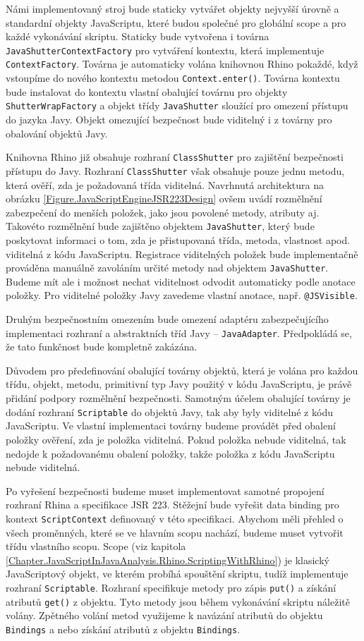 Námi implementovaný stroj bude staticky vytvářet objekty nejvyšší úrovně a standardní objekty JavaScriptu, které budou společné pro globální scope a pro každé vykonávání skriptu. Staticky bude vytvořena i továrna \texttt{JavaShutterContextFactory} pro vytváření kontextu, která implementuje \texttt{ContextFactory}. Továrna je automaticky volána knihovnou Rhino pokaždé, když vstoupíme do nového kontextu metodou \texttt{Context.enter()}. Továrna kontextu bude instalovat do kontextu vlastní obalující továrnu pro objekty \texttt{ShutterWrapFactory} a objekt třídy \texttt{JavaShutter} sloužící pro omezení přístupu do jazyka Javy. Objekt omezující bezpečnost bude viditelný i z továrny pro obalování objektů Javy.

Knihovna Rhino již obsahuje rozhraní \texttt{ClassShutter} pro zajištění bezpečnosti přístupu do Javy. Rozhraní \texttt{ClassShutter} však obsahuje pouze jednu metodu, která ověří, zda je požadovaná třída viditelná. Navrhnutá architektura na obrázku \ref{Figure.JavaScriptEngineJSR223Design} ovšem uvádí rozmělnění zabezpečení do menších položek, jako jsou povolené metody, atributy aj. Takovéto rozmělnění bude zajištěno objektem \texttt{JavaShutter}, který bude poskytovat informaci o tom, zda je přistupovaná třída, metoda, vlastnost apod. viditelná z kódu JavaScriptu. Registrace viditelných položek bude implementačně prováděna manuálně zavoláním určité metody nad objektem \texttt{JavaShutter}. Budeme mít ale i možnost nechat viditelnost odvodit automaticky podle anotace položky. Pro viditelné položky Javy zavedeme vlastní anotace, např. \texttt{@JSVisible}. 

Druhým bezpečnostním omezením bude omezení adaptéru zabezpečujícího implementaci rozhraní a abstraktních tříd Javy -- \texttt{JavaAdapter}. Předpokládá se, že tato funkčnost bude kompletně zakázána.

Důvodem pro předefinování obalující továrny objektů, která je volána pro každou třídu, objekt, metodu, primitivní typ Javy použitý v kódu JavaScriptu, je právě přidání podpory rozmělnění bezpečnosti. Samotným účelem obalující továrny je dodání rozhraní \texttt{Scriptable} do objektů Javy, tak aby byly viditelné z kódu JavaScriptu. Ve vlastní implementaci továrny budeme provádět před obalení položky ověření, zda je položka viditelná. Pokud položka nebude viditelná, tak nedojde k požadovanému obalení položky, takže položka z kódu JavaScriptu nebude viditelná.

Po vyřešení bezpečnosti budeme muset implementovat samotné propojení rozhraní Rhina a specifikace JSR 223. Stěžejní bude vyřešit data binding pro kontext \texttt{ScriptContext} definovaný v této specifikaci. Abychom měli přehled o všech proměnných, které se ve hlavním scopu nachází, budeme muset vytvořit třídu vlastního scopu. Scope (viz kapitola \ref{Chapter.JavaScriptInJavaAnalysis.Rhino.ScriptingWithRhino}) je klasický JavaScriptový objekt, ve kterém probíhá spouštění skriptu, tudíž implementuje rozhraní \texttt{Scriptable}. Rozhraní specifikuje metody pro zápis \texttt{put()} a získání atributů \texttt{get()} z objektu. Tyto metody jsou během vykonávání skriptu náležitě volány. Zpětného volání metod využijeme k navázání atributů do objektu \texttt{Bindings} a nebo získání atributů z objektu \texttt{Bindings}. 

